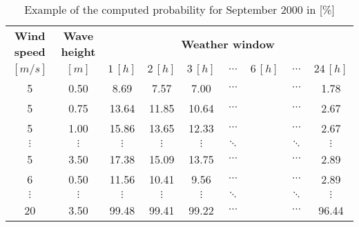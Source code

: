 \begin{table}
\label{tab:proba}
\begin{tabular}{ccccccccc}
\hline
{\bf Wind speed} & {\bf Wave height} & \multicolumn{ 7}{c}{{\bf Weather window}} \\
$[m/s]$      &      $[m]$      &          $1\, [h]$ &          $2\, [h]$ &          $3\, [h]$ &  $\cdots$ & $6\, [h]$  & $\cdots$ &        $24\, [h]$ \\
\hline
5 &       0.50 &       8.69 &       7.57 &       7.00 &  $\cdots$ & & $\cdots$ &      1.78 \\
5 &       0.75 &      13.64 &      11.85 &      10.64 &  $\cdots$ & & $\cdots$ &      2.67 \\
5 &       1.00 &      15.86 &      13.65 &      12.33 &  $\cdots$ & & $\cdots$ &      2.67 \\
 $\vdots$ &  $\vdots$ &  $\vdots$ &  $\vdots$ &  $\vdots$ &  $\ddots$ & & $\ddots$ &  $\vdots$ \\
5 &       3.50 &      17.38 &      15.09 &      13.75 &  $\cdots$ & & $\cdots$ &       2.89 \\
6 &       0.50 &      11.56 &      10.41 &       9.56 &  $\cdots$ & & $\cdots$ &      2.89 \\
 $\vdots$ &  $\vdots$ &  $\vdots$ &  $\vdots$ &  $\vdots$ & $\ddots$ & &        $\ddots$ &  $\vdots$ \\
20 &       3.50 &      99.48 &      99.41 &      99.22 &  $\cdots$ & & $\cdots$ &      96.44 \\
\hline
\end{tabular}  

\caption{Example of the computed probability for September 2000 in [\%]}
\end{table}